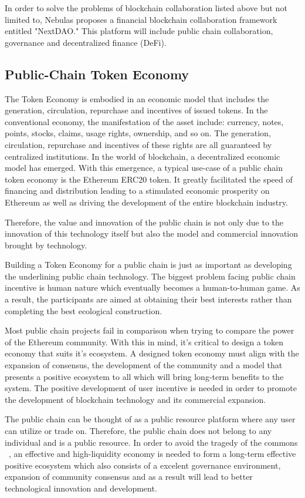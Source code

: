 In order to solve the problems of blockchain collaboration listed above but not limited to, Nebulas proposes a financial blockchain collaboration framework entitled "NextDAO." This platform will include public chain collaboration, governance and decentralized finance (DeFi).

\subsection{Public-Chain Token Economy}
The Token Economy is embodied in an economic model that includes the generation, circulation, repurchase and incentives of issued tokens. In the conventional economy, the manifestation of the asset include: currency, notes, points, stocks, claims, usage rights, ownership, and so on. The generation, circulation, repurchase and incentives of these rights are all guaranteed by centralized institutions. In the world of blockchain, a decentralized economic model has emerged. With this emergence, a typical use-case of a public chain token economy is the Ethereum ERC20 token. It greatly facilitated the speed of financing and distribution leading to a stimulated economic prosperity on Ethereum as well as driving the development of the entire blockchain industry. 

Therefore, the value and innovation of the public chain is not only due to the innovation of this technology itself but also the model and commercial innovation brought by technology.

Building a Token Economy for a public chain is just as important as developing the underlining public chain technology. The biggest problem facing public chain incentive is human nature which eventually becomes a human-to-human game. As a result, the participants are aimed at obtaining their best interests rather than completing the best ecological construction. 

Most public chain projects fail in comparison when trying to compare the power of the Ethereum community. With this in mind, it's critical to design a token economy that suits it's ecosystem. A designed token economy must align with the expansion of consensus, the development of the community and a model that presents a positive ecosystem to all which will bring long-term benefits to the system. The positive development of user incentive is needed in order to promote the development of blockchain technology and its commercial expansion.

The public chain can be thought of as a public resource platform where any user can utilize or trade on. Therefore, the public chain does not belong to any individual and is a public resource. In order to avoid the tragedy of the commons ~\cite{TragedyOfTheCommons}, an effective and high-liquidity economy is needed to form a long-term effective positive ecosystem which also consists of a excelent governance environment, expansion of community consensus and as a result will lead to better technological innovation and development.

